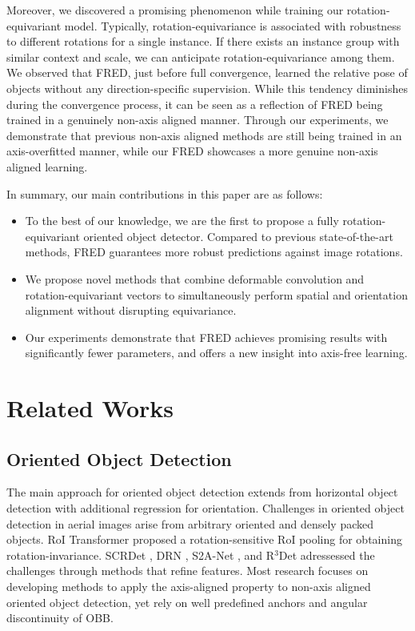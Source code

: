 \documentclass[letterpaper]{article} %
\begin{document}
Moreover, we discovered a promising phenomenon while training our rotation-equivariant model. Typically, rotation-equivariance is associated with robustness to different rotations for a single instance. If there exists an instance group with similar context and scale, we can anticipate rotation-equivariance among them. We observed that FRED, just before full convergence, learned the relative pose of objects without any direction-specific supervision. While this tendency diminishes during the convergence process, it can be seen as a reflection of FRED being trained in a genuinely non-axis aligned manner. Through our experiments, we demonstrate that previous non-axis aligned methods are still being trained in an axis-overfitted manner, while our FRED showcases a more genuine non-axis aligned learning.

In summary, our main contributions in this paper are as follows:
\begin{itemize}
    \item To the best of our knowledge, we are the first to propose a fully rotation-equivariant oriented object detector. Compared to previous state-of-the-art methods, FRED guarantees more robust predictions against image rotations.
    \item We propose novel methods that combine deformable convolution and rotation-equivariant vectors to simultaneously perform spatial and orientation alignment without disrupting equivariance.
    \item Our experiments demonstrate that FRED achieves promising results with significantly fewer parameters, and offers a new insight into axis-free learning.
\end{itemize}




\section{Related Works}

\subsection{Oriented Object Detection}
The main approach for oriented object detection extends from horizontal object detection with additional regression for orientation. Challenges in oriented object detection in aerial images arise from arbitrary oriented and densely packed objects. RoI Transformer \citep{roitransformer} proposed a rotation-sensitive RoI pooling for obtaining rotation-invariance. SCRDet \citep{scrdet}, DRN \citep{pan2020drn}, S2A-Net \citep{han2021s2anet}, and R$^3$Det \citep{yang2021r3det} adressessed the challenges through methods that refine features. Most research focuses on developing methods to apply the axis-aligned property to non-axis aligned oriented object detection, yet rely on well predefined anchors and angular discontinuity of OBB.\citep{qian2021rsdet, yang2022kfiou}
\end{document}
